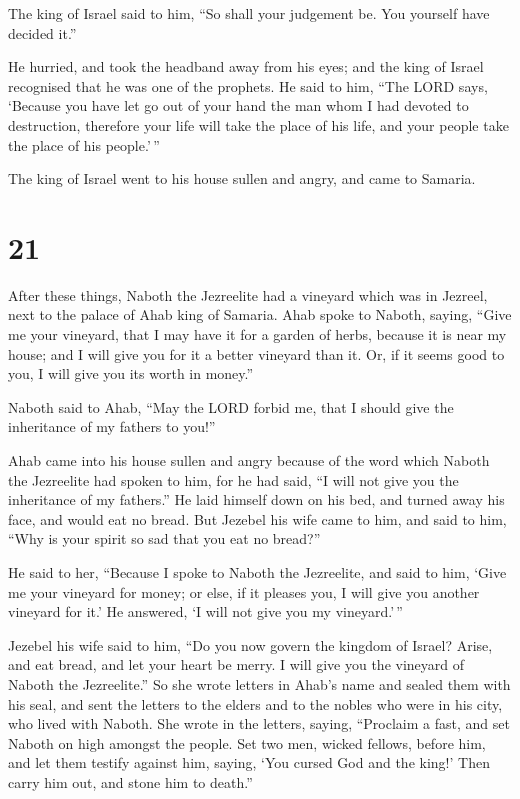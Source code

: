 The king of Israel said to him, ``So shall your judgement be. You
yourself have decided it.''

 He hurried, and took the headband away from his eyes;
and the king of Israel recognised that he was one of the prophets.
 He said to him, ``The LORD says, `Because you have let
go out of your hand the man whom I had devoted to destruction, therefore
your life will take the place of his life, and your people take the
place of his people.'\,''

 The king of Israel went to his house sullen and angry,
and came to Samaria.

\hypertarget{section-20}{%
\section{21}\label{section-20}}

 After these things, Naboth the Jezreelite had a vineyard
which was in Jezreel, next to the palace of Ahab king of Samaria.
 Ahab spoke to Naboth, saying, ``Give me your vineyard,
that I may have it for a garden of herbs, because it is near my house;
and I will give you for it a better vineyard than it. Or, if it seems
good to you, I will give you its worth in money.''

 Naboth said to Ahab, ``May the LORD forbid me, that I
should give the inheritance of my fathers to you!''

 Ahab came into his house sullen and angry because of the
word which Naboth the Jezreelite had spoken to him, for he had said, ``I
will not give you the inheritance of my fathers.'' He laid himself down
on his bed, and turned away his face, and would eat no bread.
 But Jezebel his wife came to him, and said to him, ``Why
is your spirit so sad that you eat no bread?''

 He said to her, ``Because I spoke to Naboth the
Jezreelite, and said to him, `Give me your vineyard for money; or else,
if it pleases you, I will give you another vineyard for it.' He
answered, `I will not give you my vineyard.'\,''

 Jezebel his wife said to him, ``Do you now govern the
kingdom of Israel? Arise, and eat bread, and let your heart be merry. I
will give you the vineyard of Naboth the Jezreelite.''  So
she wrote letters in Ahab's name and sealed them with his seal, and sent
the letters to the elders and to the nobles who were in his city, who
lived with Naboth.  She wrote in the letters, saying,
``Proclaim a fast, and set Naboth on high amongst the people.
 Set two men, wicked fellows, before him, and let them
testify against him, saying, `You cursed God and the king!' Then carry
him out, and stone him to death.''


